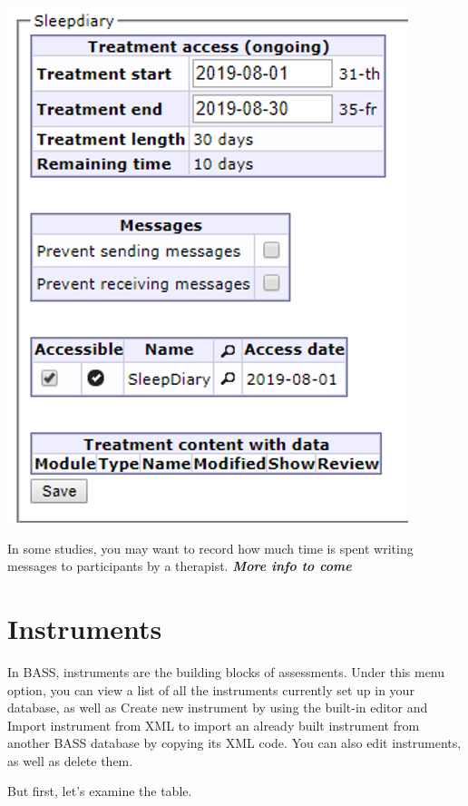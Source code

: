 \documentclass[
]{book}
\begin{document}
\includegraphics{images/new-images/participantTreatAccess.png}

In some studies, you may want to record how much time is spent writing messages to participants by a therapist. \emph{\textbf{More info to come}}

\chapter{Instruments}\label{instruments}

In BASS, instruments are the building blocks of assessments. Under this menu option, you can view a list of all the instruments currently set up in your database, as well as Create new instrument by using the built-in editor and Import instrument from XML to import an already built instrument from another BASS database by copying its XML code. You can also edit instruments, as well as delete them.

But first, let's examine the table.
\end{document}
